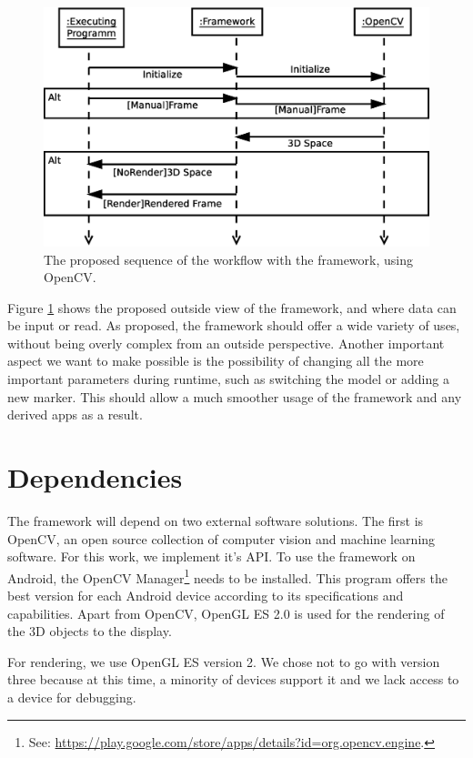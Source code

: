 \begin{figure}
	\centering
	\includegraphics[width=12cm]{img/sequence_access.eps}
	\caption[Access Sequence.]{The proposed sequence of the workflow with the framework, using OpenCV.}
	\label{fig:sequence_access}
\end{figure}

Figure \ref{fig:sequence_access} shows the proposed outside view of the framework, and where data can be input or read.
As proposed, the framework should offer a wide variety of uses, without being overly complex from an outside perspective.
Another important aspect we want to make possible is the possibility of changing all the more important parameters during runtime, such as switching the model or adding a new marker.
This should allow a much smoother usage of the framework and any derived apps as a result.

\section{Dependencies}

The framework will depend on two external software solutions.
The first is OpenCV, an open source collection of computer vision and machine learning software.
For this work, we implement it's API.
To use the framework on Android, the OpenCV Manager\footnote{See: \url{https://play.google.com/store/apps/details?id=org.opencv.engine}.} needs to be installed.
This program offers the best version for each Android device according to its specifications and capabilities.
Apart from OpenCV, OpenGL ES 2.0 is used for the rendering of the 3D objects to the display.

For rendering, we use OpenGL ES version 2.
We chose not to go with version three because at this time, a minority of devices support it and we lack access to a device for debugging.

